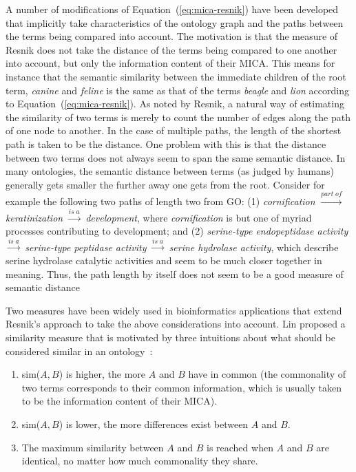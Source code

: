 \documentclass{article}
\begin{document}
 
A number of modifications of Equation~(\ref{eq:mica-resnik}) have 
been developed that implicitly take characteristics of the ontology 
graph and the paths between the terms being compared into account. 
The motivation is that the measure of Resnik does not take the 
distance of the terms being compared to one another  into account, but 
only the information content of their MICA. This 
means for instance that the semantic similarity between the immediate 
children of the root term, \textit{canine} and \textit{feline} is the 
same as that of the terms \textit{beagle} and \textit{lion} according 
to Equation~(\ref{eq:mica-resnik}). As noted by Resnik, a natural way 
of estimating the similarity of two terms is merely to count the 
number of edges along the path of one node to another. In the case of 
multiple paths, the length of the shortest path is taken to be the 
distance. One problem with this is that the distance between two terms 
does not always seem to span the same semantic distance. In many 
ontologies, the semantic distance between terms (as judged by humans) 
generally gets smaller the further away one gets from the 
root. Consider for example the following two paths of length two from 
GO: (1) \textit{cornification} $\xrightarrow{part{\; }of}$ 
\textit{keratinization} $\xrightarrow{is{\; }a}$ \textit{development}, 
where \textit{cornification} is but one of myriad processes 
contributing to development; and (2) \textit{serine-type endopeptidase 
  activity} $\xrightarrow{is{\; }a}$ \textit{serine-type peptidase 
  activity} $\xrightarrow{is{\; }a}$ \textit{serine hydrolase 
  activity}, which describe serine hydrolase catalytic activities and 
seem to be much closer together in meaning. Thus, the path length by 
itself does not seem to be a good measure of semantic distance 
 
Two measures have been widely used in bioinformatics applications that 
extend Resnik's approach to take the above considerations into 
account. Lin proposed a similarity measure that is motivated by three 
intuitions about what should be considered similar in an ontology~\cite{Lin1998}: 
\begin{enumerate} 
\item sim($A,B$) is higher, the more  $A$ and $B$ have in common (the 
  commonality of two terms corresponds to their common information, 
  which is usually taken to be the information content of their MICA). 
\item sim($A,B$) is lower, the more differences exist between $A$ and 
  $B$. 
\item The maximum similarity between $A$ and $B$ is reached when $A$ 
  and $B$ are identical, no matter how much commonality they share. 
\end{enumerate} 
 
\end{document}
